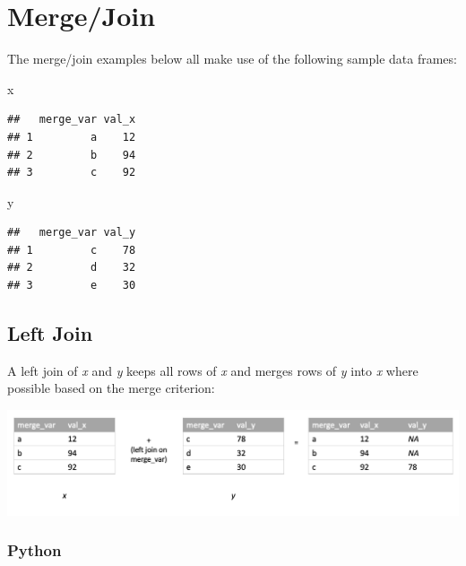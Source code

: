 \documentclass[
]{book}
\newenvironment{Shaded}{\begin{snugshade}}{\end{snugshade}}
\newcommand{\NormalTok}[1]{#1}
\begin{document}
\hypertarget{mergejoin}{%
\section{Merge/Join}\label{mergejoin}}

The merge/join examples below all make use of the following sample data frames:

\begin{Shaded}
\begin{Highlighting}[]
\NormalTok{x}
\end{Highlighting}
\end{Shaded}

\begin{verbatim}
##   merge_var val_x
## 1         a    12
## 2         b    94
## 3         c    92
\end{verbatim}

\begin{Shaded}
\begin{Highlighting}[]
\NormalTok{y}
\end{Highlighting}
\end{Shaded}

\begin{verbatim}
##   merge_var val_y
## 1         c    78
## 2         d    32
## 3         e    30
\end{verbatim}

\hypertarget{left-join}{%
\subsection{Left Join}\label{left-join}}

A left join of \emph{x} and \emph{y} keeps all rows of \emph{x} and merges rows of \emph{y} into \emph{x} where possible based on the merge criterion:

\includegraphics[width=17.25in]{images/left_join}

\hypertarget{python-34}{%
\subsubsection*{Python}\label{python-34}}
\end{document}
